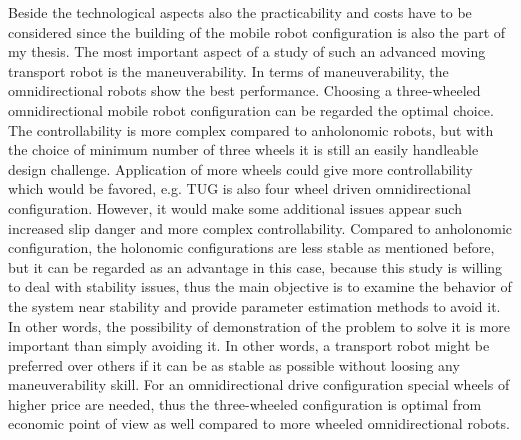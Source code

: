 \documentclass[12pt,english,twoside]{article}
\begin{document}
Beside the technological aspects also the practicability and costs have to be considered since the building of the mobile robot configuration is also the part of my thesis. The most important aspect of a study of such an advanced moving transport robot is the maneuverability. In terms of maneuverability, the omnidirectional robots show the best performance. Choosing a three-wheeled omnidirectional mobile robot configuration can be regarded the optimal choice. The controllability is more complex compared to anholonomic robots, but with the choice of minimum number of three wheels it is still an easily handleable design challenge. Application of more wheels could give more controllability which would be favored, e.g. TUG is also four wheel driven omnidirectional configuration. However, it would make some additional issues appear such increased slip danger and more complex controllability. Compared to anholonomic configuration, the holonomic configurations are less stable as mentioned before, but it can be regarded as an advantage in this case, because this study is willing to deal with stability issues, thus the main objective is to examine the behavior of the system near stability and provide parameter estimation methods to avoid it. In other words, the possibility of demonstration of the problem to solve it is more important than simply avoiding it.
In other words, a transport robot might be preferred over others if it can be as stable as possible without loosing any maneuverability skill. For an omnidirectional drive configuration special wheels of higher price are needed, thus the three-wheeled configuration is optimal from economic point of view as well compared to more wheeled omnidirectional robots.
\end{document}
